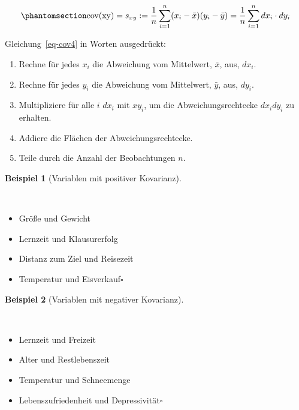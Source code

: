 \documentclass[
  letterpaper,
  oneside,
  open=any]{scrbook}
\providecommand{\tightlist}{%
  \setlength{\itemsep}{0pt}\setlength{\parskip}{0pt}}\usepackage{longtable,booktabs,array}
\theoremstyle{definition}
\theoremstyle{definition}
\newtheorem{example}{Beispiel}[chapter]
\theoremstyle{definition}
\theoremstyle{remark}
\begin{document}
\begin{equation}\phantomsection\label{eq-cov4}{\text{cov(xy)} = s_{xy}:=\frac{1}{n}\sum_{i=1}^n (x_i-\bar{x})(y_i-\bar{y}) = \frac{1}{n}\sum_{i=1}^n dx_i\cdot dy_i}\end{equation}

Gleichung~\ref{eq-cov4} in Worten ausgedrückt:

\begin{enumerate}
\def\labelenumi{\arabic{enumi}.}
\tightlist
\item
  Rechne für jedes \(x_i\) die Abweichung vom Mittelwert, \(\bar{x}\),
  aus, \(dx_i\).
\item
  Rechne für jedes \(y_i\) die Abweichung vom Mittelwert, \(\bar{y}\),
  aus, \(dy_i\).
\item
  Multipliziere für alle \(i\) \(dx_i\) mit \(xy_i\), um die
  Abweichungsrechtecke \(dx_i dy_i\) zu erhalten.
\item
  Addiere die Flächen der Abweichungsrechtecke.
\item
  Teile durch die Anzahl der Beobachtungen \(n\).
\end{enumerate}

\begin{example}[Variablen mit positiver
Kovarianz]\protect\hypertarget{exm-pos-kov}{}\label{exm-pos-kov}

~

\begin{itemize}
\tightlist
\item
  Größe und Gewicht
\item
  Lernzeit und Klausurerfolg
\item
  Distanz zum Ziel und Reisezeit
\item
  Temperatur und Eisverkauf\(\square\)
\end{itemize}

\end{example}

\begin{example}[Variablen mit negativer
Kovarianz]\protect\hypertarget{exm-neg-kov}{}\label{exm-neg-kov}

~

\begin{itemize}
\tightlist
\item
  Lernzeit und Freizeit
\item
  Alter und Restlebenszeit
\item
  Temperatur und Schneemenge
\item
  Lebenszufriedenheit und Depressivität\(\square\)
\end{itemize}

\end{example}
\end{document}
